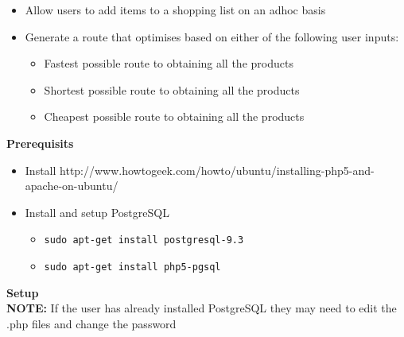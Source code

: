 \documentclass[10pt, a4paper, onecolumn]{scrartcl}
\begin{document}
	\begin{itemize}
		\item
		Allow users to add items to a shopping list on an adhoc basis
		\item
		Generate a route that optimises based on either of the following user
		inputs:
		
		\begin{itemize}
			\item
			Fastest possible route to obtaining all the products
			\item
			Shortest possible route to obtaining all the products
			\item
			Cheapest possible route to obtaining all the products
		\end{itemize}
	\end{itemize}
	
	\textbf{Prerequisits}
	
	\begin{itemize}[noitemsep]
		\item
		Install
		http://www.howtogeek.com/howto/ubuntu/installing-php5-and-apache-on-ubuntu/
		\item
		Install and setup PostgreSQL
		
		\begin{itemize}[noitemsep]
			\item
			\texttt{sudo\ apt-get\ install\ postgresql-9.3}
			\item
			\texttt{sudo\ apt-get\ install\ php5-pgsql}
		\end{itemize}
	\end{itemize}
	
	\textbf{Setup} \\
	
	\textbf{NOTE:} If the user has already installed PostgreSQL they may
	need to edit the .php files and change the password
	
\end{document}
